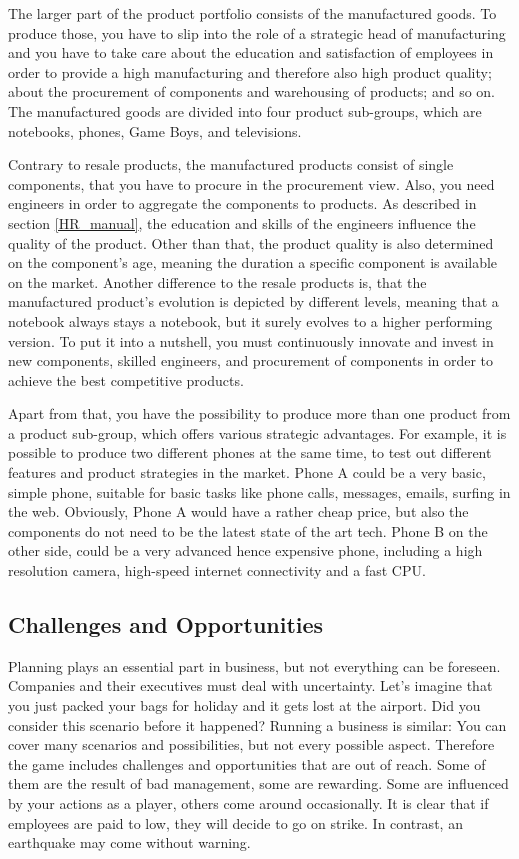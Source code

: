 \documentclass[11pt,titlepage,oneside,openany]{book}
\begin{document}
The larger part of the product portfolio consists of the manufactured goods. To produce those, you have to slip into the role of a strategic head of manufacturing and you have to take care about the education and satisfaction of employees in order to provide a high manufacturing and therefore also high product quality; about the procurement of components and warehousing of products; and so on.
The manufactured goods are divided into four product sub-groups, which are notebooks, phones, Game Boys, and televisions. 

Contrary to resale products, the manufactured products consist of single components, that you have to procure in the procurement view. Also, you need engineers in order to aggregate the components to products. As described in section \ref{HR_manual}, the education and skills of the engineers influence the quality of the product. Other than that, the product quality is also determined on the component's age, meaning the duration a specific component is available on the market. Another difference to the resale products is, that the manufactured product's evolution is depicted by different levels, meaning that a notebook always stays a notebook, but it surely evolves to a higher performing version. To put it into a nutshell, you must continuously innovate and invest in new components, skilled engineers, and procurement of components in order to achieve the best competitive products. 

Apart from that, you have the possibility to produce more than one product from a product sub-group, which offers various strategic advantages. For example, it is possible to produce two different phones at the same time, to test out different features and product strategies in the market. Phone A could be a very basic, simple phone, suitable for basic tasks like phone calls, messages, emails, surfing in the web. Obviously, Phone A would have a rather cheap price, but also the components do not need to be the latest state of the art tech. Phone B on the other side, could be a very advanced hence expensive phone, including a high resolution camera, high-speed internet connectivity and a fast CPU.

\subsection{Challenges and Opportunities}

Planning plays an essential part in business, but not everything can be foreseen. Companies and their executives must deal with uncertainty. Let's imagine that you just packed your bags for holiday and it gets lost at the airport. Did you consider this scenario before it happened? Running a business is similar: You can cover many scenarios and possibilities, but not every possible aspect. Therefore the game includes challenges and opportunities that are out of reach. Some of them are the result of bad management, some are rewarding. Some are influenced by your actions as a player, others come around occasionally. It is clear that if employees are paid to low, they will decide to go on strike. In contrast, an earthquake may come without warning. 
\end{document}
